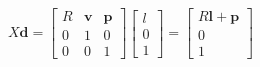 \begin{equation}
    X\mathbf{d}=\begin{bmatrix}
      R & \mathbf{v} & \mathbf{p} \\ 
        0 & 1 & 0 \\ 
        0 & 0 & 1
    \end{bmatrix}
    \begin{bmatrix}
        l \\
        0 \\
        1
    \end{bmatrix}
    =\begin{bmatrix}
      R\mathbf{l}+ \mathbf{p} \\ 
      0 \\
      1
    \end{bmatrix}
  \label{eq:gps_model}

\end{equation}
